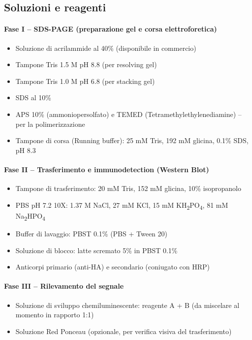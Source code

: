 \subsection{Soluzioni e reagenti}

\paragraph{Fase I – SDS-PAGE (preparazione gel e corsa elettroforetica)}
\begin{itemize}
  \item Soluzione di acrilammide al 40\% (disponibile in commercio)
  \item Tampone Tris 1.5 M pH 8.8 (per resolving gel)
  \item Tampone Tris 1.0 M pH 6.8 (per stacking gel)
  \item SDS al 10\%
  \item APS 10\% (ammoniopersolfato) e TEMED (Tetramethylethylenediamine) – per la polimerizzazione
  \item Tampone di corsa (Running buffer): 25 mM Tris, 192 mM glicina, 0.1\% SDS, pH 8.3
\end{itemize}

\paragraph{Fase II – Trasferimento e immunodetection (Western Blot)}
\begin{itemize}
  \item Tampone di trasferimento: 20 mM Tris, 152 mM glicina, 10\% isopropanolo
  \item PBS pH 7.2 10X: 1.37 M NaCl, 27 mM KCl, 15 mM KH\textsubscript{2}PO\textsubscript{4}, 81 mM Na\textsubscript{2}HPO\textsubscript{4}
  \item Buffer di lavaggio: PBST 0.1\% (PBS + Tween 20)
  \item Soluzione di blocco: latte scremato 5\% in PBST 0.1\%
  \item Anticorpi primario (anti-HA) e secondario (coniugato con HRP)
\end{itemize}

\paragraph{Fase III – Rilevamento del segnale}
\begin{itemize}
  \item Soluzione di sviluppo chemiluminescente: reagente A + B (da miscelare al momento in rapporto 1:1)
  \item Soluzione Red Ponceau (opzionale, per verifica visiva del trasferimento)
\end{itemize}

